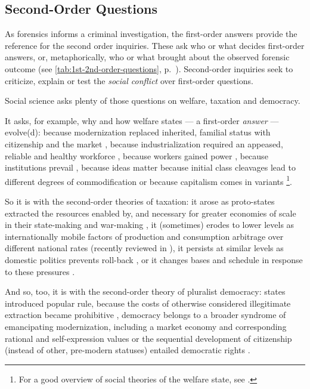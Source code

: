 \subsection{Second-Order Questions \label{sec:2nd-questions}}
As forensics informs a criminal investigation, the first-order answers provide the reference for the second order inquiries. 
These ask who or what decides first-order answers, or, metaphorically, who or what brought about the observed forensic outcome (see \autoref{tab:1st-2nd-order-questions}, p.~\pageref{tab:1st-2nd-order-questions}).
Second-order inquiries seek to criticize, explain or test the \emph{social conflict} over first-order questions.
 
Social science asks plenty of those questions on welfare, taxation and democracy.

It asks, for example, why and how welfare states --- a first-order \emph{answer} --- evolve(d): because modernization replaced inherited, familial status with citizenship and the market \citep{Titmuss1974,Marshall-1950-aa}, because industrialization required an appeased, reliable and healthy workforce \citep{Flora1981,Wilensky1975}, because workers gained power \citep{Korpi1983,Jessop2002}, because institutions prevail \citep[for example,][]{Rothstein}, because ideas matter \citep[for example,][]{Stiller2009} because initial class cleavages lead to different degrees of commodification \citep{Esping-Andersen-1990-aa} or because capitalism comes in variants \citep{HallSoskice-2001-aa}
\footnote{
	For a good overview of social theories of the welfare state, see \cite{BrooksManza2007} %
	.
}. 

So it is with the second-order theories of taxation: it arose as proto-states extracted the resources enabled by, and necessary for greater economies of scale in their state-making and war-making \citep{Tilly-1985-aa}, it (sometimes) erodes to lower levels as internationally mobile factors of production and consumption arbitrage over different national rates (recently reviewed in \citealt{Genschel2010}), it persists at similar levels as domestic politics prevents roll-back \citep{Swank2002}, or it changes bases and schedule in response to these pressures \citep{Kemmerling2009}.  %

And so, too, it is with the second-order theory of pluralist democracy: states introduced popular rule, because the costs of otherwise considered illegitimate extraction became prohibitive \citep{Tilly2006}, democracy belongs to a broader syndrome of emancipating modernization, including a market economy and corresponding rational and self-expression values \citep{InglehartWelzel-2005-aa} or the sequential development of citizenship (instead of other, pre-modern statuses) entailed democratic rights \citep{Marshall-1950-aa}. %

